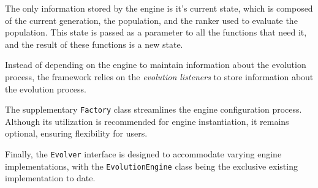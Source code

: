   The only information stored by the engine is it's current state, which is
  composed of the current generation, the population, and the ranker used to
  evaluate the population.
  This state is passed as a parameter to all the functions that need it, and
  the result of these functions is a new state.

  Instead of depending on the engine to maintain information about the evolution
  process, the framework relies on the \emph{evolution listeners} to store
  information about the evolution process.

  The supplementary \texttt{Factory} class streamlines the engine configuration 
  process.
  Although its utilization is recommended for engine instantiation, it remains 
  optional, ensuring flexibility for users.

  Finally, the \texttt{Evolver} interface is designed to accommodate varying 
  engine implementations, with the \texttt{EvolutionEngine} class being the 
  exclusive existing implementation to date.
